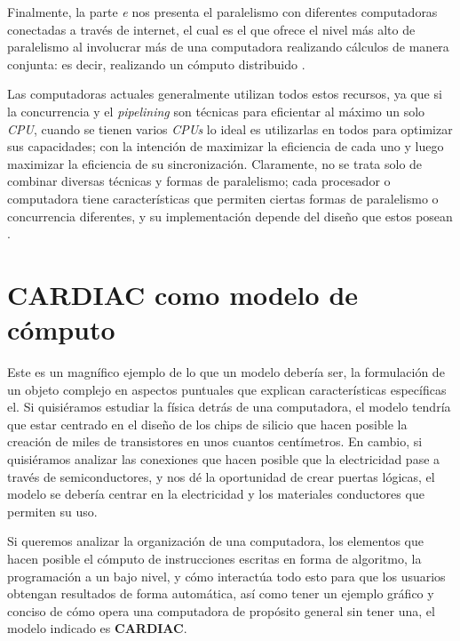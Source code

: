 \documentclass[letterpaper,12pt,oneside]{book}
\begin{document}
        Finalmente, la parte \textit{e} nos presenta el paralelismo
		con diferentes computadoras conectadas a través de internet, el cual es el que ofrece el nivel más alto de paralelismo al involucrar
		más de una computadora realizando cálculos de manera conjunta: es decir, realizando un cómputo distribuido \cite{tanenbaum_structured_2013}.

		
		
		Las computadoras actuales generalmente utilizan todos estos recursos, ya que si la concurrencia y el \textit{pipelining} son técnicas
		para eficientar al máximo un solo \textit{CPU}, cuando se tienen varios \textit{CPUs} lo ideal es utilizarlas en todos para optimizar sus capacidades; con la intención de maximizar la eficiencia de cada uno y luego maximizar la eficiencia
		de su sincronización. Claramente, no se trata solo de combinar diversas técnicas y formas de paralelismo; cada procesador o computadora
		tiene características que permiten ciertas formas de paralelismo o concurrencia diferentes, y su implementación depende del diseño que estos posean \cite{tanenbaum_structured_2013}.

	\clearpage			
	
	\section{CARDIAC como modelo de cómputo}
	
	Este es un magnífico ejemplo de lo que un modelo debería ser, la formulación de un objeto
	complejo en aspectos puntuales que explican características específicas el.
 Si quisiéramos estudiar la física detrás de una computadora, el modelo tendría que estar centrado
	en el diseño de los chips de silicio que hacen posible la creación de miles de transistores en unos cuantos centímetros. En cambio, si quisiéramos 
	analizar las conexiones que hacen posible que la electricidad pase a través de semiconductores, y nos dé la oportunidad de crear puertas lógicas,
	el modelo se debería centrar en la electricidad y los materiales conductores que permiten su uso.
 
    Si queremos analizar la organización
	de una computadora, los elementos que hacen posible el cómputo de instrucciones escritas en 
	forma de algoritmo, la programación
	a un bajo nivel, y cómo interactúa todo esto para que los usuarios obtengan resultados 
	de forma automática, así como tener un ejemplo gráfico y 	
	conciso de cómo opera una computadora
	de propósito general sin tener una, el modelo indicado es \textbf{CARDIAC}.
	
\end{document}
